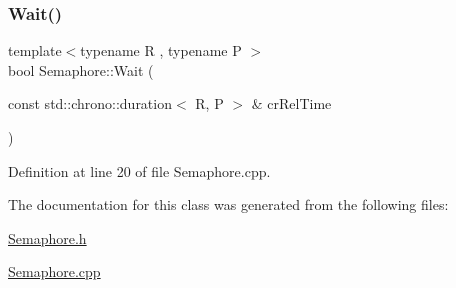 \mbox{\label{class_semaphore_a7f700173ae86ae623684109066e07656}} 
\subsubsection{\texorpdfstring{Wait()}{Wait()}\hspace{0.1cm}{\footnotesize\ttfamily [2/2]}}
{\footnotesize\ttfamily template$<$typename R , typename P $>$ \\
bool Semaphore\+::\+Wait (\begin{DoxyParamCaption}\item[{const std\+::chrono\+::duration$<$ R, P $>$ \&}]{cr\+Rel\+Time }\end{DoxyParamCaption})}



Definition at line 20 of file Semaphore.\+cpp.



The documentation for this class was generated from the following files\+:\begin{DoxyCompactItemize}
\item 
\hyperlink{_semaphore_8h}{Semaphore.\+h}\item 
\hyperlink{_semaphore_8cpp}{Semaphore.\+cpp}\end{DoxyCompactItemize}
